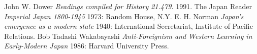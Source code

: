 \begin{thebibliography}{1}
	 John W. Dower {\em Readings compiled for History
		21.479.}  1991.
	  The Japan Reader {\em Imperial Japan 1800-1945} 1973:
	Random House, N.Y.
	 E. H. Norman {\em Japan's emergence as a modern
		state} 1940: International Secretariat, Institute of Pacific
	Relations.
	 Bob Tadashi Wakabayashi {\em Anti-Foreignism and Western
		Learning in Early-Modern Japan} 1986: Harvard University Press.
\end{thebibliography} 